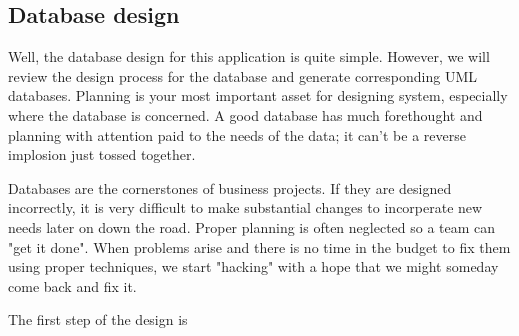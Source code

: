 \subsection{Database design}

Well, the database design for this application is quite simple.  However, we will review the design process for the database and generate corresponding UML databases.  Planning is your most important asset for designing system, especially where the database is concerned.  A good database has much forethought and planning with attention paid to the needs of the data; it can't be a reverse implosion just tossed together.

Databases are the cornerstones of business projects.  If they are designed incorrectly, it is very difficult to make substantial changes to incorperate new needs later on down the road.  Proper planning is often neglected so a team can "get it done".  When problems arise and there is no time in the budget to fix them using proper techniques, we start "hacking" with a hope that we might someday come back and fix it.

The first step of the design is 